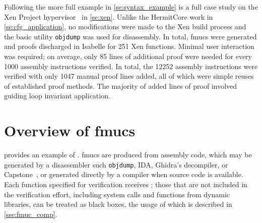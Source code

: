 Following the more full example in \cref{se:syntax_example} is a full case study
on the Xen Project hypervisor~\citep{chisnall2008definitive} in \cref{se:xen}.
Unlike the HermitCore work in \cref{se:cfg_application},
no modifications were made to the Xen build process
and the basic utility \texttt{objdump} was used for disassembly.
In total, \acp{fmuc} were generated and proofs discharged in Isabelle
for 251 Xen functions.
Minimal user interaction was required;
on average, only \num{85} lines of additional proof were needed
for every \num{1000} assembly instructions verified.
In total, the \num{12252} assembly instructions
were verified with only \num{1047} manual proof lines added,
all of which were simple reuses of established proof methods.
The majority of added lines of proof involved guiding loop invariant application.

\section{Overview of \acsp*{fmuc}}\label{se:fmuc_ex}
 provides an example of .
\Acp{fmuc} are produced from assembly code,
which may be generated by a disassembler such \texttt{objdump}, IDA,
Ghidra's decompiler, or Capstone~\citep{capstone},
or generated directly by a compiler when source code is available.
Each function specified for verification receives ;
those that are not included in the verification effort,
including system calls and functions from dynamic libraries,
can be treated as black boxes, the usage of which is described in \cref{sse:fmuc_comp}.

